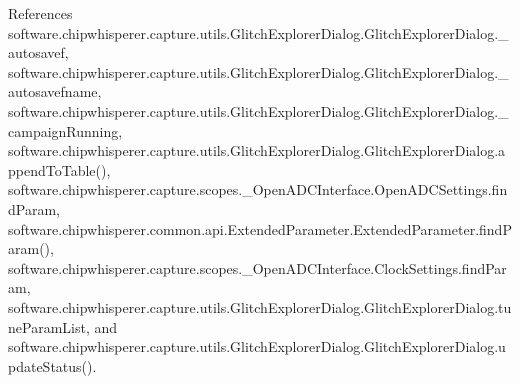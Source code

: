 References software.\+chipwhisperer.\+capture.\+utils.\+Glitch\+Explorer\+Dialog.\+Glitch\+Explorer\+Dialog.\+\_\+autosavef, software.\+chipwhisperer.\+capture.\+utils.\+Glitch\+Explorer\+Dialog.\+Glitch\+Explorer\+Dialog.\+\_\+autosavefname, software.\+chipwhisperer.\+capture.\+utils.\+Glitch\+Explorer\+Dialog.\+Glitch\+Explorer\+Dialog.\+\_\+campaign\+Running, software.\+chipwhisperer.\+capture.\+utils.\+Glitch\+Explorer\+Dialog.\+Glitch\+Explorer\+Dialog.\+append\+To\+Table(), software.\+chipwhisperer.\+capture.\+scopes.\+\_\+\+Open\+A\+D\+C\+Interface.\+Open\+A\+D\+C\+Settings.\+find\+Param, software.\+chipwhisperer.\+common.\+api.\+Extended\+Parameter.\+Extended\+Parameter.\+find\+Param(), software.\+chipwhisperer.\+capture.\+scopes.\+\_\+\+Open\+A\+D\+C\+Interface.\+Clock\+Settings.\+find\+Param, software.\+chipwhisperer.\+capture.\+utils.\+Glitch\+Explorer\+Dialog.\+Glitch\+Explorer\+Dialog.\+tune\+Param\+List, and software.\+chipwhisperer.\+capture.\+utils.\+Glitch\+Explorer\+Dialog.\+Glitch\+Explorer\+Dialog.\+update\+Status().


